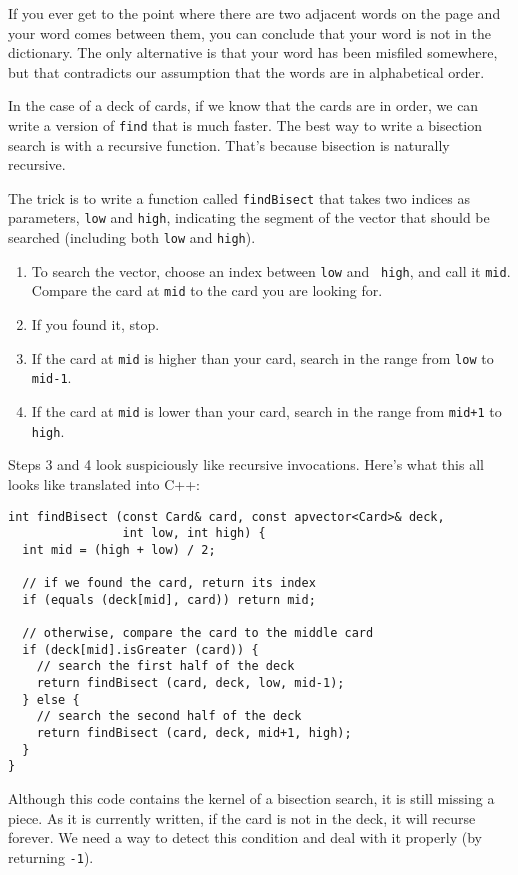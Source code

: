 If you ever get to the point where there are two adjacent words on the
page and your word comes between them, you can conclude that your word
is not in the dictionary.  The only alternative is that your word has
been misfiled somewhere, but that contradicts our assumption that the
words are in alphabetical order.

In the case of a deck of cards, if we know that the cards are in
order, we can write a version of {\tt find} that is much faster.  The
best way to write a bisection search is with a recursive function.
That's because bisection is naturally recursive.


The trick is to write a function called {\tt findBisect} that takes
two indices as parameters, {\tt low} and {\tt high}, indicating the
segment of the vector that should be searched (including both
{\tt low} and {\tt high}).

\begin{enumerate}

\item To search the vector, choose an index between {\tt low} and {\tt
high}, and call it {\tt mid}.  Compare the card at {\tt mid} to the
card you are looking for.

\item If you found it, stop.

\item If the card at {\tt mid} is higher than your card, search
in the range from {\tt low} to {\tt mid-1}.

\item If the card at {\tt mid} is lower than your card, search
in the range from {\tt mid+1} to {\tt high}.

\end{enumerate}
%
Steps 3 and 4 look suspiciously like recursive
invocations.  Here's what this all looks like translated into
C++:

\begin{verbatim}
int findBisect (const Card& card, const apvector<Card>& deck,
                int low, int high) {
  int mid = (high + low) / 2;

  // if we found the card, return its index
  if (equals (deck[mid], card)) return mid;

  // otherwise, compare the card to the middle card
  if (deck[mid].isGreater (card)) {
    // search the first half of the deck
    return findBisect (card, deck, low, mid-1);
  } else {
    // search the second half of the deck
    return findBisect (card, deck, mid+1, high);
  }
}
\end{verbatim}
%
Although this code contains the kernel of a bisection search, it
is still missing a piece.  As it is currently written,
if the card is not in the deck, it will recurse forever.  We
need a way to detect this condition and deal with it properly
(by returning {\tt -1}).

